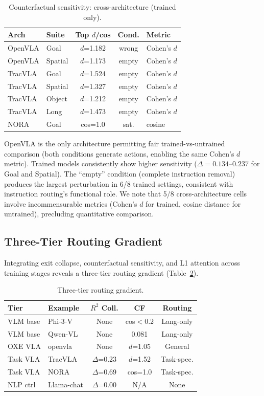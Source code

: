 \documentclass[10pt,twocolumn]{article}
\begin{document}
\begin{table}[t]
\centering
\caption{Counterfactual sensitivity: cross-architecture (trained only).}
\label{tab:cf_cross_arch}
\small
\begin{tabular}{llccl}
\toprule
Arch & Suite & Top $d$/cos & Cond. & Metric \\
\midrule
OpenVLA & Goal & $d$=1.182 & wrong & Cohen's $d$ \\
OpenVLA & Spatial & $d$=1.173 & empty & Cohen's $d$ \\
TracVLA & Goal & $d$=1.524 & empty & Cohen's $d$ \\
TracVLA & Spatial & $d$=1.327 & empty & Cohen's $d$ \\
TracVLA & Object & $d$=1.212 & empty & Cohen's $d$ \\
TracVLA & Long & $d$=1.473 & empty & Cohen's $d$ \\
NORA & Goal & cos=1.0 & sat. & cosine \\
\bottomrule
\end{tabular}
\end{table}

OpenVLA is the only architecture permitting fair trained-vs-untrained comparison (both conditions generate actions, enabling the same Cohen's $d$ metric).
Trained models consistently show higher sensitivity ($\Delta = 0.134$--$0.237$ for Goal and Spatial).
The ``empty'' condition (complete instruction removal) produces the largest perturbation in 6/8 trained settings, consistent with instruction routing's functional role.
We note that 5/8 cross-architecture cells involve incommensurable metrics (Cohen's $d$ for trained, cosine distance for untrained), precluding quantitative comparison.

\subsection{Three-Tier Routing Gradient}
\label{sec:gradient}

Integrating exit collapse, counterfactual sensitivity, and L1 attention across training stages reveals a three-tier routing gradient (Table~\ref{tab:gradient}).

\begin{table}[t]
\centering
\caption{Three-tier routing gradient.}
\label{tab:gradient}
\small
\begin{tabular}{p{1.3cm}p{1.1cm}ccc}
\toprule
Tier & Example & $R^2$ Coll. & CF & Routing \\
\midrule
VLM base & Phi-3-V & None & cos$<$0.2 & Lang-only \\
VLM base & Qwen-VL & None & 0.081 & Lang-only \\
OXE VLA & openvla & None & $d$=1.05 & General \\
Task VLA & TracVLA & $\Delta$=0.23 & $d$=1.52 & Task-spec. \\
Task VLA & NORA & $\Delta$=0.69 & cos=1.0 & Task-spec. \\
NLP ctrl & Llama-chat & $\Delta$=0.00 & N/A & None \\
\bottomrule
\end{tabular}
\end{table}
\end{document}
